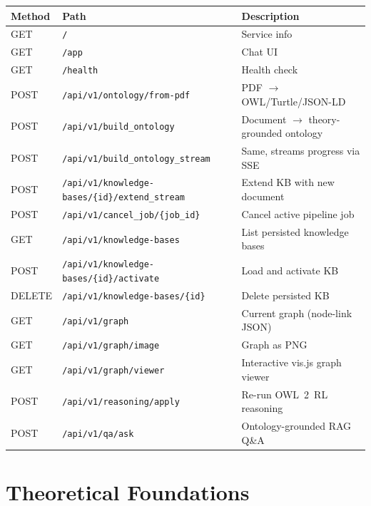 \documentclass[11pt,a4paper]{article}
\begin{document}
\begin{center}
\begin{tabular}{@{}llp{5.5cm}@{}}
\toprule
\textbf{Method} & \textbf{Path} & \textbf{Description} \\
\midrule
GET & \texttt{/} & Service info \\
GET & \texttt{/app} & Chat UI \\
GET & \texttt{/health} & Health check \\
POST & \texttt{/api/v1/ontology/from-pdf} & PDF $\rightarrow$ OWL/Turtle/JSON-LD \\
POST & \texttt{/api/v1/build\_ontology} & Document $\rightarrow$ theory-grounded ontology \\
POST & \texttt{/api/v1/build\_ontology\_stream} & Same, streams progress via SSE \\
POST & \texttt{/api/v1/knowledge-bases/\{id\}/extend\_stream} & Extend KB with new document \\
POST & \texttt{/api/v1/cancel\_job/\{job\_id\}} & Cancel active pipeline job \\
GET & \texttt{/api/v1/knowledge-bases} & List persisted knowledge bases \\
POST & \texttt{/api/v1/knowledge-bases/\{id\}/activate} & Load and activate KB \\
DELETE & \texttt{/api/v1/knowledge-bases/\{id\}} & Delete persisted KB \\
GET & \texttt{/api/v1/graph} & Current graph (node-link JSON) \\
GET & \texttt{/api/v1/graph/image} & Graph as PNG \\
GET & \texttt{/api/v1/graph/viewer} & Interactive vis.js graph viewer \\
POST & \texttt{/api/v1/reasoning/apply} & Re-run OWL~2~RL reasoning \\
POST & \texttt{/api/v1/qa/ask} & Ontology-grounded RAG Q\&A \\
\bottomrule
\end{tabular}
\end{center}

\section{Theoretical Foundations}
\end{document}
